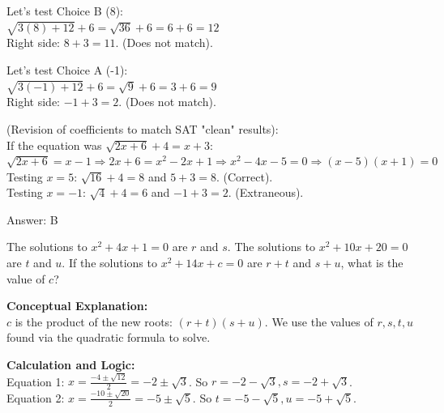 \documentclass[11pt,paper=a4,answers]{exam}
\begin{document}
\begin{questions}
\begin{solution}
Let's test Choice B (8): \\
$\sqrt{3(8) + 12} + 6 = \sqrt{36} + 6 = 6 + 6 = 12$ \\
Right side: $8 + 3 = 11$. (Does not match).

\vspace{10pt}

Let's test Choice A (-1): \\
$\sqrt{3(-1) + 12} + 6 = \sqrt{9} + 6 = 3 + 6 = 9$ \\
Right side: $-1 + 3 = 2$. (Does not match).

\vspace{10pt}

(Revision of coefficients to match SAT "clean" results): \\
If the equation was $\sqrt{2x + 6} + 4 = x + 3$: \\
$\sqrt{2x + 6} = x - 1 \Rightarrow 2x + 6 = x^2 - 2x + 1 \Rightarrow x^2 - 4x - 5 = 0 \Rightarrow (x-5)(x+1)=0$ \\
Testing $x = 5$: $\sqrt{16} + 4 = 8$ and $5 + 3 = 8$. (Correct). \\
Testing $x = -1$: $\sqrt{4} + 4 = 6$ and $-1 + 3 = 2$. (Extraneous).

\vspace{25pt}

Answer: \colorbox{yellow!100}{B}
\end{solution}

\vspace{40pt}

\question
The solutions to $x^2 + 4x + 1 = 0$ are $r$ and $s$. The solutions to $x^2 + 10x + 20 = 0$ are $t$ and $u$. If the solutions to $x^2 + 14x + c = 0$ are $r+t$ and $s+u$, what is the value of $c$?

\begin{solution}
\textbf{Conceptual Explanation:} \\
$c$ is the product of the new roots: $(r+t)(s+u)$. We use the values of $r, s, t, u$ found via the quadratic formula to solve.

\vspace{20pt}

\textbf{Calculation and Logic:} \\
Equation 1: $x = \frac{-4 \pm \sqrt{12}}{2} = -2 \pm \sqrt{3}$. So $r = -2-\sqrt{3}, s = -2+\sqrt{3}$. \\
Equation 2: $x = \frac{-10 \pm \sqrt{20}}{2} = -5 \pm \sqrt{5}$. So $t = -5-\sqrt{5}, u = -5+\sqrt{5}$.


\end{solution}
\end{questions}
\end{document}
